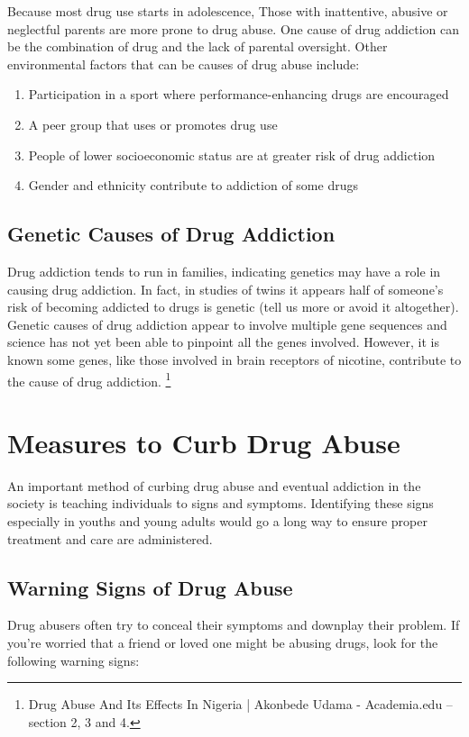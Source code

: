 \documentclass{report}
\begin{document}
Because most drug use starts in adolescence, Those with inattentive, abusive or neglectful parents are more prone to drug abuse. One cause of drug addiction can be the combination of drug and the lack of parental oversight.
Other environmental factors that can be causes of drug abuse include:
\begin{enumerate}
    \item 
    Participation in a sport where performance-enhancing drugs are encouraged
    
    \item
    A peer group that uses or promotes drug use
    
    \item
    People of lower socioeconomic status are at greater risk of drug addiction

    \item
    Gender and ethnicity contribute to addiction of some drugs
\end{enumerate}

\subsection{Genetic Causes of Drug Addiction}
Drug addiction tends to run in families, indicating genetics may have a role in causing drug addiction. In fact, in studies of twins it appears half of someone's risk of becoming addicted to drugs is genetic  (tell us more or avoid it altogether). Genetic causes of drug addiction appear to involve multiple gene sequences and science has not yet been able to pinpoint all the genes involved. However, it is known some genes, like those involved in brain receptors of nicotine, contribute to the cause of drug addiction. \footnote{Drug Abuse And Its Effects In Nigeria | Akonbede Udama - Academia.edu – section 2, 3 and 4.}

\section{Measures to Curb Drug Abuse}
An important method of curbing drug abuse and eventual addiction in the society is teaching individuals to signs and symptoms. Identifying these signs especially in youths and young adults would go a long way to ensure proper treatment and care are administered.  


\subsection{Warning Signs of Drug Abuse}
Drug abusers often try to conceal their symptoms and downplay their problem. If you’re worried that a friend or loved one might be abusing drugs, look for the following warning signs:
\end{document}

